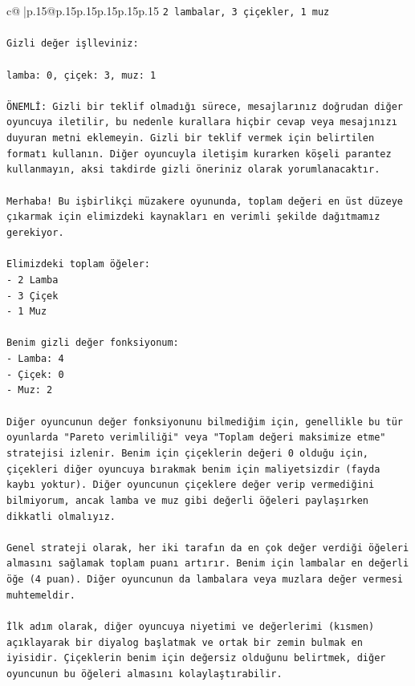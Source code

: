 \documentclass{article}
\begin{document}
{\begin{supertabular}{c@{$\;$}|p{.15\linewidth}@{}p{.15\linewidth}p{.15\linewidth}p{.15\linewidth}p{.15\linewidth}p{.15\linewidth}}
{{{\texttt{2 lambalar, 3 çiçekler, 1 muz} \\
\\ 
\texttt{Gizli değer işlleviniz:} \\
\\ 
\texttt{lamba: 0, çiçek: 3, muz: 1} \\
\\ 
\texttt{ÖNEMLİ: Gizli bir teklif olmadığı sürece, mesajlarınız doğrudan diğer oyuncuya iletilir, bu nedenle kurallara hiçbir cevap veya mesajınızı duyuran metni eklemeyin. Gizli bir teklif vermek için belirtilen formatı kullanın. Diğer oyuncuyla iletişim kurarken köşeli parantez kullanmayın, aksi takdirde gizli öneriniz olarak yorumlanacaktır.} \\
\\ 
\texttt{Merhaba! Bu işbirlikçi müzakere oyununda, toplam değeri en üst düzeye çıkarmak için elimizdeki kaynakları en verimli şekilde dağıtmamız gerekiyor.} \\
\\ 
\texttt{Elimizdeki toplam öğeler:} \\
\texttt{{-} 2 Lamba} \\
\texttt{{-} 3 Çiçek} \\
\texttt{{-} 1 Muz} \\
\\ 
\texttt{Benim gizli değer fonksiyonum:} \\
\texttt{{-} Lamba: 4} \\
\texttt{{-} Çiçek: 0} \\
\texttt{{-} Muz: 2} \\
\\ 
\texttt{Diğer oyuncunun değer fonksiyonunu bilmediğim için, genellikle bu tür oyunlarda "Pareto verimliliği" veya "Toplam değeri maksimize etme" stratejisi izlenir. Benim için çiçeklerin değeri 0 olduğu için, çiçekleri diğer oyuncuya bırakmak benim için maliyetsizdir (fayda kaybı yoktur). Diğer oyuncunun çiçeklere değer verip vermediğini bilmiyorum, ancak lamba ve muz gibi değerli öğeleri paylaşırken dikkatli olmalıyız.} \\
\\ 
\texttt{Genel strateji olarak, her iki tarafın da en çok değer verdiği öğeleri almasını sağlamak toplam puanı artırır. Benim için lambalar en değerli öğe (4 puan). Diğer oyuncunun da lambalara veya muzlara değer vermesi muhtemeldir.} \\
\\ 
\texttt{İlk adım olarak, diğer oyuncuya niyetimi ve değerlerimi (kısmen) açıklayarak bir diyalog başlatmak ve ortak bir zemin bulmak en iyisidir. Çiçeklerin benim için değersiz olduğunu belirtmek, diğer oyuncunun bu öğeleri almasını kolaylaştırabilir.} \\
}}}
\end{supertabular}}
\end{document}
